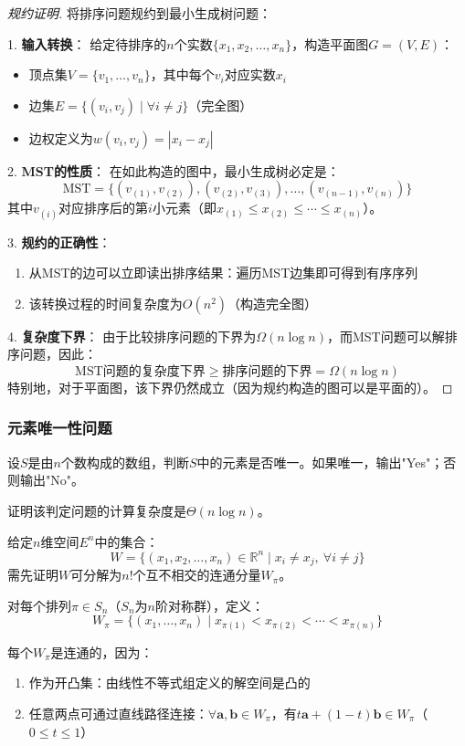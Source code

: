 \documentclass[./../main.tex]{subfiles}
\begin{document}
\begin{proof}[规约证明]
将排序问题规约到最小生成树问题：

1. \textbf{输入转换}：
   给定待排序的$n$个实数$\{x_1, x_2, \ldots, x_n\}$，构造平面图$G=(V,E)$：
   \begin{itemize}
     \item 顶点集$V = \{v_1, \ldots, v_n\}$，其中每个$v_i$对应实数$x_i$
     \item 边集$E = \{(v_i,v_j) \mid \forall i \neq j\}$（完全图）
     \item 边权定义为$w(v_i,v_j) = |x_i - x_j|$
   \end{itemize}

2. \textbf{MST的性质}：
   在如此构造的图中，最小生成树必定是：
   $$
   \text{MST} = \{(v_{(1)},v_{(2)}), (v_{(2)},v_{(3)}), \ldots, (v_{(n-1)},v_{(n)})\}
   $$
   其中$v_{(i)}$对应排序后的第$i$小元素（即$x_{(1)} \leq x_{(2)} \leq \cdots \leq x_{(n)}$）。

3. \textbf{规约的正确性}：
   \begin{enumerate}
     \item 从MST的边可以立即读出排序结果：遍历MST边集即可得到有序序列
     \item 该转换过程的时间复杂度为$O(n^2)$（构造完全图）
   \end{enumerate}

4. \textbf{复杂度下界}：
   由于比较排序问题的下界为$\Omega(n\log n)$，而MST问题可以解排序问题，因此：
   $$
   \text{MST问题的复杂度下界} \geq \text{排序问题的下界} = \Omega(n\log n)
   $$
   特别地，对于平面图，该下界仍然成立（因为规约构造的图可以是平面的）。
\end{proof}

\subsubsection{元素唯一性问题}
设$S$是由$n$个数构成的数组，判断$S$中的元素是否唯一。如果唯一，输出"Yes"；否则输出"No"。

证明该判定问题的计算复杂度是$\Theta(n\log n)$。


给定$n$维空间$E^n$中的集合：
$$ W = \{(x_1,x_2,\dots,x_n) \in \mathbb{R}^n \mid x_i \neq x_j,\ \forall i \neq j\} $$
需先证明$W$可分解为$n!$个互不相交的连通分量$W_\pi$。

对每个排列$\pi \in S_n$（$S_n$为$n$阶对称群），定义：
$$ W_\pi = \{(x_1,\dots,x_n) \mid x_{\pi(1)} < x_{\pi(2)} < \cdots < x_{\pi(n)}\} $$

每个$W_\pi$是连通的，因为：
\begin{enumerate}
    \item 作为开凸集：由线性不等式组定义的解空间是凸的
    \item 任意两点可通过直线路径连接：$\forall \mathbf{a},\mathbf{b} \in W_\pi$，有$t\mathbf{a} + (1-t)\mathbf{b} \in W_\pi$（$0 \leq t \leq 1$）
\end{enumerate}
\end{document}
